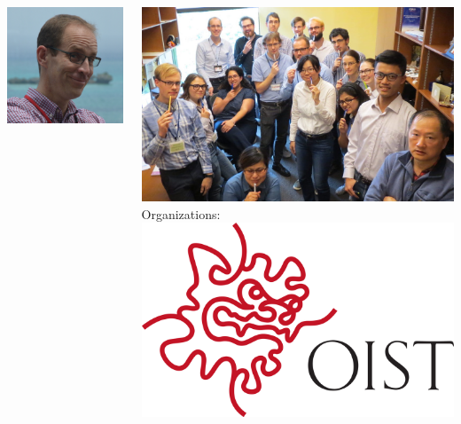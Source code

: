 \documentclass{beamer}
\begin{document}
\begin{frame}
\begin{columns}
\begin{columns}
\includegraphics[width=\textwidth]{TB.JPG}
\end{columns}
\includegraphics[width=\textwidth]{unit.JPG}
Organizations:
\includegraphics[width=\textwidth]{OIST.png}

\end{columns}
\end{frame}
\end{document}
